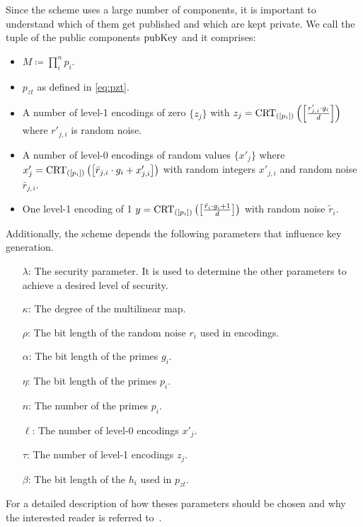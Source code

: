 \documentclass[english]{scrartcl}
\theoremstyle{plain}
\theoremstyle{definition}
\begin{document}
    Since the scheme uses a large number of components, it is important to understand which of them get published and which are kept private. We call the tuple of the public components $\mathrm{pubKey}$ and it comprises:
    \begin{itemize}
        \item $M \coloneqq \prod_i^n p_i$.
        \item $p_{zt}$ as defined in \cref{eq:pzt}.
        \item A number of level-1 encodings of zero $\{z_j\}$ with $z_j = \operatorname{CRT}_{([p_{i}])}\left(\left[\frac{r'_{j,i} \cdot g_i}{d}\right]\right)$ where $r'_{j,i}$ is random noise.
        \item A number of level-0 encodings of random values $\{x'_j\}$ where $x'_j = \operatorname{CRT}_{([p_{i}])}\left(\left[\bar{r}_{j,i} \cdot g_i + x'_{j,i}\right]\right)$ with random integers $x'_{j,i}$ and random noise $\bar{r}_{j,i}$.
        \item One level-1 encoding of 1 $y = \operatorname{CRT}_{([p_{i}])}\left(\left[\frac{\tilde{r}_{i} \cdot g_i + 1}{d}\right]\right)$ with random noise $\tilde{r}_{i}$.
    \end{itemize}
    Additionally, the scheme depends the following parameters that influence key generation.
    \begin{itemize}
        \item[$\lambda$:] The security parameter. It is used to determine the other parameters to achieve a desired level of security.
        \item[$\kappa$:] The degree of the multilinear map.
        \item[$\rho$:] The bit length of the random noise $r_i$ used in encodings.
        \item[$\alpha$:] The bit length of the primes $g_i$.
        \item[$\eta$:] The bit length of the primes $p_i$.
        \item[$n$:] The number of the primes $p_i$.
        \item[$\ell$:] The number of level-0 encodings $x'_j$.
        \item[$\tau$:] The number of level-1 encodings $z_j$.
        \item[$\beta$:] The bit length of the $h_i$ used in $p_{zt}$.
    \end{itemize}
    For a detailed description of how theses parameters should be chosen and why the interested reader is referred to~\cite{cryptoeprint:2013:183}.
    \pagebreak
\end{document}
